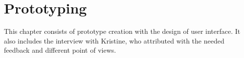 \chapter{Prototyping}
This chapter consists of prototype creation with the design of user interface. It also includes the interview with Kristine, who attributed with the needed feedback and different point of views.